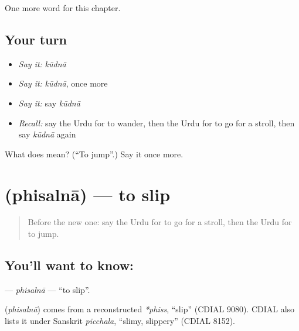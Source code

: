 \begin{grammarlens}[title={What you've built}]
One more word for this chapter.
\end{grammarlens}

\subsection*{Your turn}
\begin{itemize}
\raggedright
  \item \emph{Say it:} \emph{kūdnā}
  \item \emph{Say it:} \emph{kūdnā}, once more
  \item \emph{Say it:} say \emph{kūdnā}
  \item \emph{Recall:} say the Urdu for to wander, then the Urdu for to go for a stroll, then say \emph{kūdnā} again
\end{itemize}

\begin{tcolorbox}[breakable,colback=teal!4,colframe=teal!35!black,title={Before you move on}]
What does  mean? (\textquotedblleft{}To jump\textquotedblright{}.) Say it once more.
\end{tcolorbox}
\section[\texorpdfstring{\ur{پھسلنا} (phisalnā)}{پھسلنا (phisalnā)}]{ (phisalnā) — to slip}

\label{lesson:UR-C149-phisalna}



\begin{quote}
Before the new one: say the Urdu for to go for a stroll, then the Urdu for to jump.
\end{quote}

\subsection*{You'll want to know: }
\textbf{} — \emph{phisalnā} — \textquotedblleft{}to slip\textquotedblright{}.

\begin{cousinweb}
\textbf{} (\emph{phisalnā}) comes from a reconstructed \emph{*phiss}, \textquotedblleft{}slip\textquotedblright{} (CDIAL 9080). CDIAL also lists it under Sanskrit \emph{picchala}, \textquotedblleft{}slimy, slippery\textquotedblright{} (CDIAL 8152).
\end{cousinweb}

